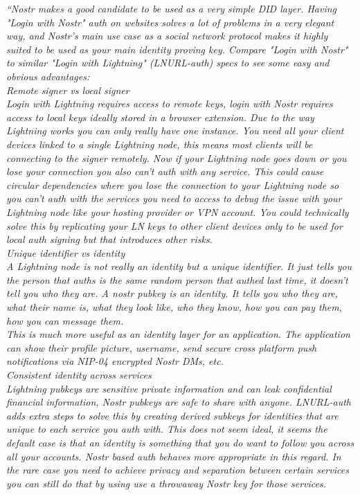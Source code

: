 \textit{``Nostr makes a good candidate to be used as a very simple DID layer. Having "Login with Nostr" auth on websites solves a lot of problems in a very elegant way, and Nostr's main use case as a social network protocol makes it highly suited to be used as your main identity proving key. Compare "Login with Nostr" to similar "Login with Lightning" (LNURL-auth) specs to see some easy and obvious advantages:\\
Remote signer vs local signer\\
Login with Lightning requires access to remote keys, login with Nostr requires access to local keys ideally stored in a browser extension. Due to the way Lightning works you can only really have one instance. You need all your client devices linked to a single Lightning node, this means most clients will be connecting to the signer remotely. Now if your Lightning node goes down or you lose your connection you also can't auth with any service. This could cause circular dependencies where you lose the connection to your Lightning node so you can't auth with the services you need to access to debug the issue with your Lightning node like your hosting provider or VPN account. You could technically solve this by replicating your LN keys to other client devices only to be used for local auth signing but that introduces other risks.\\
Unique identifier vs identity\\
A Lightning node is not really an identity but a unique identifier. It just tells you the person that auths is the same random person that authed last time, it doesn't tell you who they are. A nostr pubkey is an identity. It tells you who they are, what their name is, what they look like, who they know, how you can pay them, how you can message them.\\
This is much more useful as an identity layer for an application. The application can show their profile picture, username, send secure cross platform push notifications via NIP-04 encrypted Nostr DMs, etc.\\
Consistent identity across services\\
Lightning pubkeys are sensitive private information and can leak confidential financial information, Nostr pubkeys are safe to share with anyone. LNURL-auth adds extra steps to solve this by creating derived subkeys for identities that are unique to each service you auth with. This does not seem ideal, it seems the default case is that an identity is something that you do want to follow you across all your accounts. Nostr based auth behaves more appropriate in this regard. In the rare case you need to achieve privacy and separation between certain services you can still do that by using use a throwaway Nostr key for those services.\\
}
